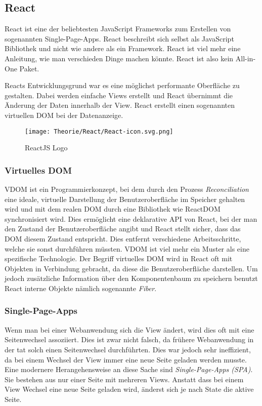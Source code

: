 \subsection{React}
\label{reactjs}
React ist eine der beliebtesten JavaScript Frameworks zum Erstellen von sogenannten 
Single-Page-Apps. React beschreibt sich selbst als JavaScript Bibliothek und nicht wie andere als 
ein Framework. React ist viel mehr eine Anleitung, wie man verschieden Dinge machen könnte.
React ist also kein All-in-One Paket.


Reacts Entwicklungsgrund war es eine möglichst performante Oberfläche zu gestalten. Dabei werden 
einfache Views erstellt und React übernimmt die Änderung der Daten innerhalb der View. React 
erstellt einen sogenannten virtuellen DOM bei der Datenanzeige.


\begin{figure}[H]
  \begin{center}
    \texttt{[image: Theorie/React/React-icon.svg.png]}
    \caption{ReactJS Logo~\cite{reactjs}}
  \end{center}
\end{figure}

\subsubsection{Virtuelles DOM}
VDOM ist ein Programmierkonzept, bei dem durch den Prozess \textit{Reconciliation} eine ideale, 
virtuelle Darstellung der Benutzeroberfläche im Speicher gehalten wird und mit dem realen DOM durch 
eine Bibliothek wie ReactDOM synchronisiert wird. Dies ermöglicht eine deklarative API von React, 
bei der man den Zustand der Benutzeroberfläche angibt und React stellt sicher, dass das DOM diesem 
Zustand entspricht. Dies entfernt verschiedene Arbeitsschritte, welche sie sonst durchführen müssten.
VDOM ist viel mehr ein Muster als eine spezifische Technologie. Der Begriff virtuelles DOM wird in 
React oft mit Objekten in Verbindung gebracht, da diese die Benutzeroberfläche darstellen. Um jedoch 
zusätzliche Information über den Komponentenbaum zu speichern benutzt React interne 
Objekte nämlich sogenannte \textit{Fiber}.\cite{DOM}

\subsubsection{Single-Page-Apps}
Wenn man bei einer Webanwendung sich die View ändert, wird dies oft mit eine Seitenwechsel 
assoziiert. Dies ist zwar nicht falsch, da frühere Webanwendung in der tat solch einen Seitenwechsel 
durchführten. Dies war jedoch sehr ineffizient, da bei einem Wechsel der View immer eine neue Seite 
geladen werden musste. Eine modernere Herangehensweise an diese Sache sind 
\textit{Single-Page-Apps (SPA)}. Sie bestehen aus nur einer Seite mit mehreren Views. Anstatt dass 
bei einem View Wechsel eine neue Seite geladen wird, änderst sich je nach State die aktive Seite.
~\cite{SPA}


